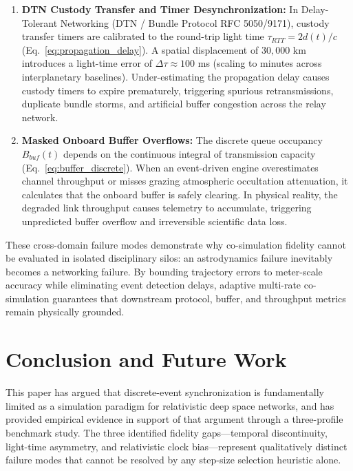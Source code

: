 \documentclass[a4paper,fleqn]{cas-sc}
\begin{document}
\begin{enumerate}
    \item \textbf{DTN Custody Transfer and Timer Desynchronization:} In Delay-Tolerant Networking (DTN / Bundle Protocol RFC 5050/9171), custody transfer timers are calibrated to the round-trip light time $\tau_{RTT} = 2 d(t) / c$ (Eq.~\eqref{eq:propagation_delay}). A spatial displacement of $30,000$ km introduces a light-time error of $\Delta \tau \approx 100$ ms (scaling to minutes across interplanetary baselines). Under-estimating the propagation delay causes custody timers to expire prematurely, triggering spurious retransmissions, duplicate bundle storms, and artificial buffer congestion across the relay network.
    
    \item \textbf{Masked Onboard Buffer Overflows:} The discrete queue occupancy $B_{buf}(t)$ depends on the continuous integral of transmission capacity (Eq.~\eqref{eq:buffer_discrete}). When an event-driven engine overestimates channel throughput or misses grazing atmospheric occultation attenuation, it calculates that the onboard buffer is safely clearing. In physical reality, the degraded link throughput causes telemetry to accumulate, triggering unpredicted buffer overflow and irreversible scientific data loss.
\end{enumerate}
These cross-domain failure modes demonstrate why co-simulation fidelity cannot be evaluated in isolated disciplinary silos: an astrodynamics failure inevitably becomes a networking failure. By bounding trajectory errors to meter-scale accuracy while eliminating event detection delays, adaptive multi-rate co-simulation guarantees that downstream protocol, buffer, and throughput metrics remain physically grounded.

\section{Conclusion and Future Work}
\label{sec:conclusion}
This paper has argued that discrete-event synchronization is fundamentally limited as a simulation paradigm for relativistic deep space networks, and has provided empirical evidence in support of that argument through a three-profile benchmark study. The three identified fidelity gaps---temporal discontinuity, light-time asymmetry, and relativistic clock bias---represent qualitatively distinct failure modes that cannot be resolved by any step-size selection heuristic alone.
\end{document}
